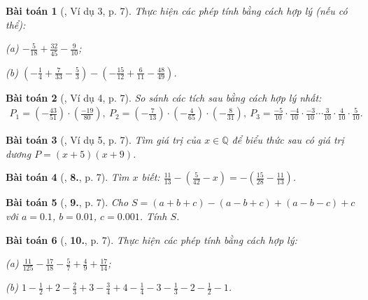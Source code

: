 \documentclass{article}
\numberwithin{equation}{section}
\newtheorem{baitoan}{Bài toán}[section]
\begin{document}
\begin{baitoan}[\cite{Tuyen_Toan_7}, Ví dụ 3, p. 7]
	Thực hiện các phép tính bằng cách hợp lý (nếu có thể):
	\begin{enumerate*}
		\item[(a)] $-\frac{5}{18} + \frac{32}{45} - \frac{9}{10}$;
		\item[(b)] $\left(-\frac{1}{4} + \frac{7}{33} - \frac{5}{3}\right) - \left(-\frac{15}{12} + \frac{6}{11} - \frac{48}{49}\right)$.
	\end{enumerate*}
\end{baitoan}

\begin{baitoan}[\cite{Tuyen_Toan_7}, Ví dụ 4, p. 7]
	So sánh các tích sau bằng cách hợp lý nhất:
	\begin{align*}
		P_1 = \left(-\frac{43}{51}\right)\cdot\left(\frac{-19}{80}\right),\ P_2 = \left(-\frac{7}{13}\right)\cdot\left(-\frac{4}{65}\right)\cdot\left(-\frac{8}{31}\right),\ P_3 = \frac{-5}{10}\cdot\frac{-4}{10}\cdot\frac{-3}{10}\cdots\frac{3}{10}\cdot\frac{4}{10}\cdot\frac{5}{10}.
	\end{align*}
\end{baitoan}

\begin{baitoan}[\cite{Tuyen_Toan_7}, Ví dụ 5, p. 7]
	Tìm giá trị của $x\in\mathbb{Q}$ để biểu thức sau có giá trị dương  $P = (x + 5)(x + 9)$.
\end{baitoan}

\begin{baitoan}[\cite{Tuyen_Toan_7}, \textbf{8.}, p. 7]
	Tìm $x$ biết: $\frac{11}{13} - \left(\frac{5}{42} - x\right) = -\left(\frac{15}{28} - \frac{11}{13}\right)$.
\end{baitoan}

\begin{baitoan}[\cite{Tuyen_Toan_7}, \textbf{9.}, p. 7]
	Cho $S = (a + b + c) - (a - b + c) + (a - b - c) + c$ với $a = 0.1$, $b = 0.01$, $c = 0.001$. Tính $S$.
\end{baitoan}

\begin{baitoan}[\cite{Tuyen_Toan_7}, \textbf{10.}, p. 7]
	Thực hiện các phép tính bằng cách hợp lý:\\
	\begin{enumerate*}
		\item[(a)] $\frac{11}{125} - \frac{17}{18} - \frac{5}{7} + \frac{4}{9} + \frac{17}{14}$;
		\item[(b)] $1 - \frac{1}{2} + 2 - \frac{2}{3} + 3 - \frac{3}{4} + 4 - \frac{1}{4} - 3 - \frac{1}{3} - 2 - \frac{1}{2} - 1$.
	\end{enumerate*}
\end{baitoan}
\end{document}
